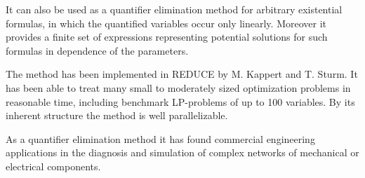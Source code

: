 It can also be used as a quantifier elimination method for arbitrary 
existential formulas, in which the quantified variables occur only
linearly. Moreover it provides a finite set of expressions 
representing potential solutions for
such formulas in dependence of the parameters.

The method has been implemented in REDUCE by M. Kappert and T.  
Sturm.
It has been able to treat many small to moderately sized  
optimization
problems in reasonable time, including benchmark LP-problems of up  
to
100 variables. By its inherent structure the method is well
parallelizable.
 

As a quantifier elimination method it has found commercial  
engineering
applications in the diagnosis and simulation of complex networks of
mechanical or  electrical components. 

 


